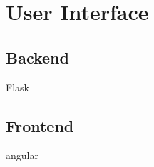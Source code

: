 \section{User Interface}\label{sec:ui}

\subsection{Backend}\label{subsec:backend}
Flask

\subsection{Frontend}\label{subsec:frontend}
angular